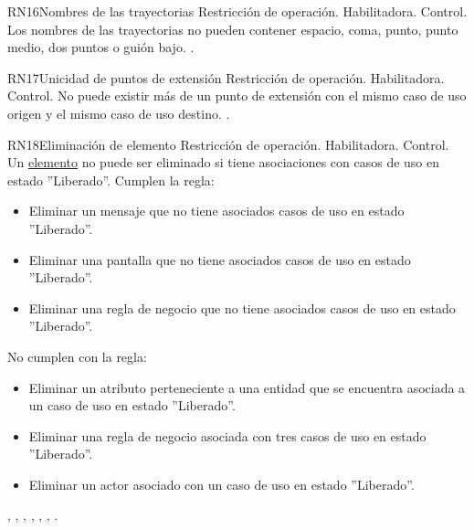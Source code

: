 \begin{BussinesRule}{RN16}{Nombres de las trayectorias} 
	\BRitem[Tipo:] Restricción de operación. 
	\BRitem[Clase:] Habilitadora. 
	\BRitem[Nivel:] Control. %
	\BRitem[Descripción:] Los nombres de las trayectorias no pueden contener espacio, coma, punto, punto medio, dos puntos o guión bajo.
	 \UCref{}{}. 
\end{BussinesRule}


\begin{BussinesRule}{RN17}{Unicidad de puntos de extensión} 
	\BRitem[Tipo:] Restricción de operación. 
	\BRitem[Clase:] Habilitadora. 
	\BRitem[Nivel:] Control. %
	\BRitem[Descripción:] No puede existir más de un punto de extensión con el mismo caso de uso origen y el mismo caso de uso destino.
	 \UCref{}{}. 
\end{BussinesRule}


\begin{BussinesRule}{RN18}{Eliminación de elemento} 
	\BRitem[Tipo:] Restricción de operación. 
	\BRitem[Clase:] Habilitadora. 
	\BRitem[Nivel:] Control. %
	\BRitem[Descripción:] Un \hyperlink{tElemento}{elemento} no puede ser eliminado si tiene asociaciones con casos de uso en estado ''Liberado''.
	 Cumplen la regla:
	\begin{itemize}
		\item Eliminar un mensaje que no tiene asociados casos de uso en estado ''Liberado''.
		\item Eliminar una pantalla que no tiene asociados casos de uso en estado ''Liberado''.
		\item Eliminar una regla de negocio que no tiene asociados casos de uso en estado ''Liberado''.
	\end{itemize}
	 No cumplen con la regla:
	\begin{itemize}
		\item Eliminar un atributo perteneciente a una entidad que se encuentra asociada a un caso de uso en estado ''Liberado''.
		\item Eliminar una regla de negocio asociada con tres casos de uso en estado ''Liberado''.
		\item Eliminar un actor asociado con un caso de uso en estado ''Liberado''.
	\end{itemize}
	 , , , , , , . 
\end{BussinesRule}


